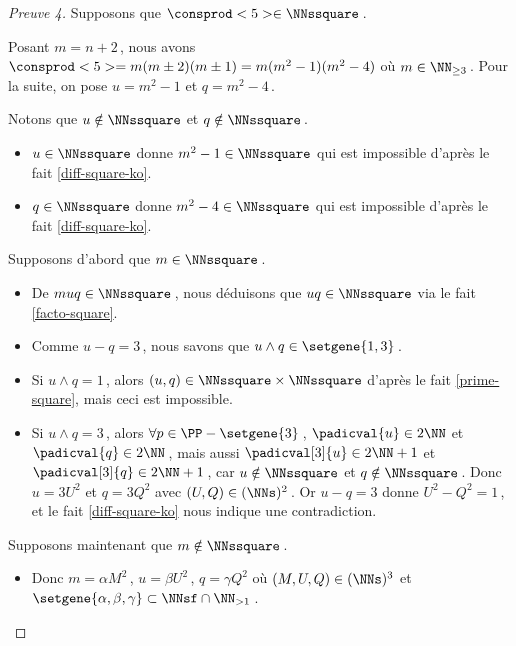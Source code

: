 \begin{proof}[Preuve 4]%
	Supposons que $\consprod<5> \in \NNssquare$\,.
	
    \smallskip
    
    Posant $m = n+2$\,, nous avons $\consprod<5> = m (m \pm 2) (m \pm 1) = m(m^2 - 1)(m^2 - 4)$ où $m \in \NN_{\geq 3}$\,.
	Pour la suite, on pose $u = m^2 - 1$ et $q = m^2 - 4$\,.

	\medskip
	
	Notons que $u \notin \NNssquare$ et $q \notin \NNssquare$\,.
	\begin{itemize}
		\item $u \in \NNssquare$ donne $m^2 - 1 \in \NNssquare$ qui est impossible d'après le fait \ref{diff-square-ko}.

		\item $q \in \NNssquare$ donne $m^2 - 4 \in \NNssquare$ qui est impossible d'après le fait \ref{diff-square-ko}.
	\end{itemize}

	\medskip
	
	Supposons d'abord que $m \in \NNssquare$\,.
	\begin{itemize}
		\item De $muq \in \NNssquare$\,, nous déduisons que $uq \in \NNssquare$ via le fait \ref{facto-square}.

		\item Comme $u - q = 3$\,, nous savons que $u \wedge q \in \setgene{1, 3}$\,.

		\item Si $u \wedge q = 1$\,, 
		alors $(u, q) \in \NNssquare \times \NNssquare$ d'après le fait \ref{prime-square}, mais ceci est impossible.

		\item Si $u \wedge q = 3$\,, 
		alors $\forall p \in \PP - \setgene{3}$\,, 
		$\padicval{u} \in 2 \NN$ et $\padicval{q} \in 2 \NN$\,,
		mais aussi $\padicval[3]{u} \in 2 \NN + 1$ et $\padicval[3]{q} \in 2 \NN + 1$\,, car  $u \notin \NNssquare$ et $q \notin \NNssquare$\,.
		Donc 
		$u = 3 U^2$ et $q = 3 Q^2$ avec $(U, Q) \in ( \NNs )^2$\,.
		Or $u - q = 3$ donne $U^2 - Q^2 = 1$\,, et le fait \ref{diff-square-ko} nous indique une contradiction.
	\end{itemize}
	
	\medskip
	
	Supposons maintenant que $m \notin \NNssquare$\,.
	\begin{itemize}
		\item Donc $m = \alpha M^2$\,, $u = \beta U^2$\,, $q = \gamma Q^2$ où $(M, U, Q) \in ( \NNs )^3$ et $\setgene{\alpha, \beta, \gamma} \subset \NNsf \cap \NN_{>1}$\,.



\end{itemize}
\end{proof}
